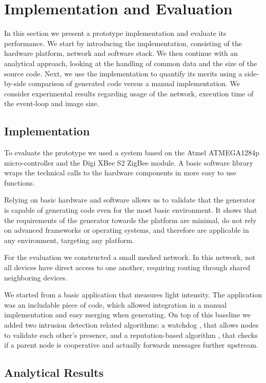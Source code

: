 \documentclass[conference]{IEEEtran}
\begin{document}
\section{Implementation and Evaluation}
\label{evaluation}

In this section we present a prototype implementation and evaluate its
performance. We start by introducing the implementation, consisting of the
hardware platform, network and software stack. We then continue with an
analytical approach, looking at the handling of common data and the size of the
source code. Next, we use the implementation to quantify its merits using a
side-by-side comparison of generated code versus a manual implementation. We
consider experimental results regarding usage of the network, execution time of
the event-loop and image size.

\subsection{Implementation}

To evaluate the prototype we used a system based on the Atmel ATMEGA1284p
micro-controller and the Digi XBee S2 ZigBee module. A basic software library
wraps the technical calls to the hardware components in more easy to use
functions.

Relying on basic hardware and software allows us to validate that the generator
is capable of generating code even for the most basic environment. It shows
that the requirements of the generator towards the platform are minimal, do not
rely on advanced frameworks or operating systems, and therefore are applicable
in any environment, targeting any platform.

For the evaluation we constructed a small meshed network. In this network, not
all devices have direct access to one another, requiring routing through shared
neighboring devices.

We started from a basic application that measures light intensity. The
application was an includable piece of code, which allowed integration in a
manual implementation and easy merging when generating. On top of this baseline
we added two intrusion detection related algorithms: a watchdog
\cite{mishra2004intrusion}, that allows nodes to validate each other's
presence, and a reputation-based algorithm \cite{ganeriwal2008reputation}, that
checks if a parent node is cooperative and actually forwards messages further
upstream.

\subsection{Analytical Results}
\end{document}

